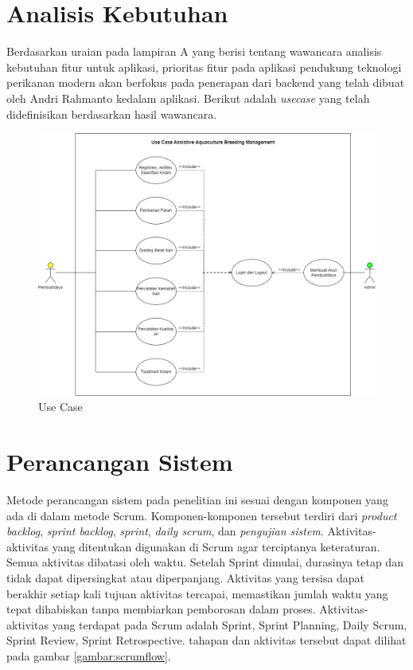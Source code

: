 \section{Analisis Kebutuhan}

Berdasarkan uraian pada lampiran A yang berisi tentang wawancara analisis kebutuhan fitur untuk aplikasi, prioritas fitur pada aplikasi pendukung teknologi perikanan modern akan berfokus pada penerapan dari backend yang telah dibuat oleh Andri Rahmanto kedalam aplikasi. Berikut adalah \textit{usecase} yang telah didefinisikan berdasarkan hasil wawancara.

\begin{figure}[H]
	\centering
	\includegraphics[keepaspectratio, width=13cm]{gambar/usecaseaquabreeding2}
	\caption{Use Case}
	\label{gambar:usecase}
\end{figure}

\section{Perancangan Sistem}

Metode perancangan sistem pada penelitian ini sesuai dengan komponen yang ada di dalam metode Scrum. Komponen-komponen tersebut terdiri dari \textit{product backlog}, \textit{sprint backlog}, \textit{sprint}, \textit{daily scrum}, dan \textit{pengujian sistem}. Aktivitas-aktivitas yang ditentukan digunakan di Scrum agar terciptanya keteraturan. Semua aktivitas dibatasi oleh waktu. Setelah Sprint dimulai, durasinya tetap dan tidak dapat dipersingkat atau diperpanjang. Aktivitas yang tersisa dapat berakhir setiap kali tujuan aktivitas tercapai, memastikan jumlah waktu yang tepat dihabiskan tanpa membiarkan pemborosan dalam proses. Aktivitas-aktivitas yang terdapat pada Scrum adalah Sprint, Sprint Planning, Daily Scrum, Sprint Review, Sprint Retrospective. tahapan dan aktivitas tersebut dapat dilihat pada gambar \ref{gambar:scrumflow}. 

